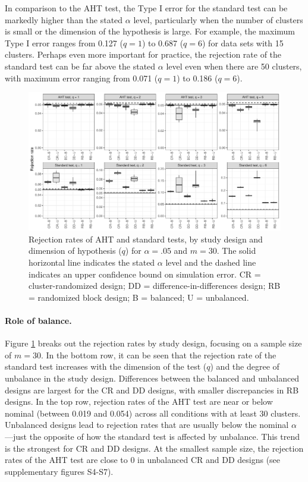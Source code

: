 \documentclass[12pt]{article}
\begin{document}
In comparison to the AHT test, the Type I error for the standard test
can be markedly higher than the stated \(\alpha\) level, particularly
when the number of clusters is small or the dimension of the hypothesis
is large. For example, the maximum Type I error ranges from 0.127
(\(q = 1\)) to 0.687 (\(q = 6\)) for data sets with 15 clusters. Perhaps
even more important for practice, the rejection rate of the standard
test can be far above the stated \(\alpha\) level even when there are 50
clusters, with maximum error ranging from 0.071 (\(q = 1\)) to 0.186
(\(q = 6\)).

\begin{figure}

{\centering \includegraphics[width=\linewidth]{CR_fig/balance-1} 

}

\caption{Rejection rates of AHT and standard tests, by study design and dimension of hypothesis ($q$) for $\alpha = .05$ and $m = 30$. The solid horizontal line indicates the stated $\alpha$ level and the dashed line indicates an upper confidence bound on simulation error. CR = cluster-randomized design; DD = difference-in-differences design; RB = randomized block design; B = balanced; U = unbalanced.}\label{fig:balance}
\end{figure}

\hypertarget{role-of-balance.}{%
\paragraph{Role of balance.}\label{role-of-balance.}}

Figure \ref{fig:balance} breaks out the rejection rates by study design,
focusing on a sample size of \(m = 30\). In the bottom row, it can be
seen that the rejection rate of the standard test increases with the
dimension of the test (\(q\)) and the degree of unbalance in the study
design. Differences between the balanced and unbalanced designs are
largest for the CR and DD designs, with smaller discrepancies in RB
designs. In the top row, rejection rates of the AHT test are near or
below nominal (between 0.019 and 0.054) across all conditions with at
least 30 clusters. Unbalanced designs lead to rejection rates that are
usually below the nominal \(\alpha\)---just the opposite of how the
standard test is affected by unbalance. This trend is the strongest for
CR and DD designs. At the smallest sample size, the rejection rates of
the AHT test are close to 0 in unbalanced CR and DD designs (see
supplementary figures S4-S7).
\end{document}
